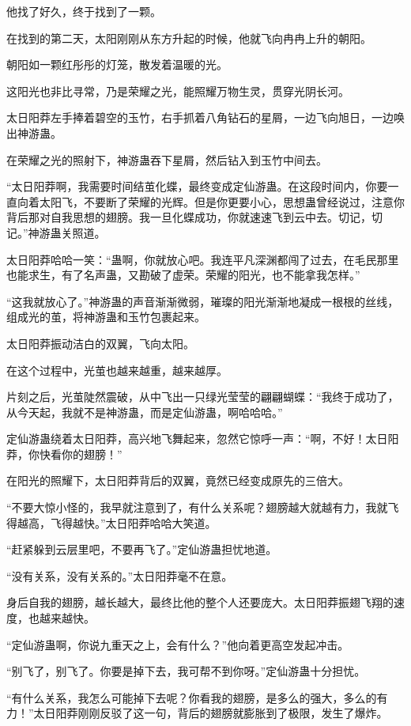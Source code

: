 \begin{this_body}
他找了好久，终于找到了一颗。

在找到的第二天，太阳刚刚从东方升起的时候，他就飞向冉冉上升的朝阳。

朝阳如一颗红彤彤的灯笼，散发着温暖的光。

这阳光也非比寻常，乃是荣耀之光，能照耀万物生灵，贯穿光阴长河。

太日阳莽左手捧着碧空的玉竹，右手抓着八角钻石的星屑，一边飞向旭日，一边唤出神游蛊。

在荣耀之光的照射下，神游蛊吞下星屑，然后钻入到玉竹中间去。

“太日阳莽啊，我需要时间结茧化蝶，最终变成定仙游蛊。在这段时间内，你要一直向着太阳飞，不要断了荣耀的光辉。但是你更要小心，思想蛊曾经说过，注意你背后那对自我思想的翅膀。我一旦化蝶成功，你就速速飞到云中去。切记，切记。”神游蛊关照道。

太日阳莽哈哈一笑：“蛊啊，你就放心吧。我连平凡深渊都闯了过去，在毛民那里也能求生，有了名声蛊，又勘破了虚荣。荣耀的阳光，也不能拿我怎样。”

“这我就放心了。”神游蛊的声音渐渐微弱，璀璨的阳光渐渐地凝成一根根的丝线，组成光的茧，将神游蛊和玉竹包裹起来。

太日阳莽振动洁白的双翼，飞向太阳。

在这个过程中，光茧也越来越重，越来越厚。

片刻之后，光茧陡然震破，从中飞出一只绿光莹莹的翩翩蝴蝶：“我终于成功了，从今天起，我就不是神游蛊，而是定仙游蛊，啊哈哈哈。”

定仙游蛊绕着太日阳莽，高兴地飞舞起来，忽然它惊呼一声：“啊，不好！太日阳莽，你快看你的翅膀！”

在阳光的照耀下，太日阳莽背后的双翼，竟然已经变成原先的三倍大。

“不要大惊小怪的，我早就注意到了，有什么关系呢？翅膀越大就越有力，我就飞得越高，飞得越快。”太日阳莽哈哈大笑道。

“赶紧躲到云层里吧，不要再飞了。”定仙游蛊担忧地道。

“没有关系，没有关系的。”太日阳莽毫不在意。

身后自我的翅膀，越长越大，最终比他的整个人还要庞大。太日阳莽振翅飞翔的速度，也越来越快。

“定仙游蛊啊，你说九重天之上，会有什么？”他向着更高空发起冲击。

“别飞了，别飞了。你要是掉下去，我可帮不到你呀。”定仙游蛊十分担忧。

“有什么关系，我怎么可能掉下去呢？你看我的翅膀，是多么的强大，多么的有力！”太日阳莽刚刚反驳了这一句，背后的翅膀就膨胀到了极限，发生了爆炸。


\end{this_body}
